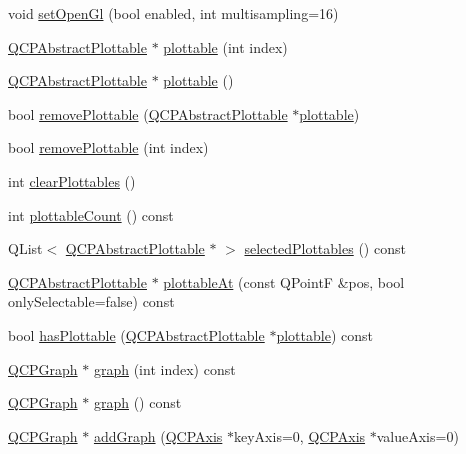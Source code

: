 \begin{DoxyCompactItemize}
\item 
void \hyperlink{class_q_custom_plot_a7db1adc09016329f3aef7c60da935789}{set\+Open\+Gl} (bool enabled, int multisampling=16)
\item 
\hyperlink{class_q_c_p_abstract_plottable}{Q\+C\+P\+Abstract\+Plottable} $\ast$ \hyperlink{class_q_custom_plot_a32de81ff53e263e785b83b52ecd99d6f}{plottable} (int index)
\item 
\hyperlink{class_q_c_p_abstract_plottable}{Q\+C\+P\+Abstract\+Plottable} $\ast$ \hyperlink{class_q_custom_plot_adea38bdc660da9412ba69fb939031567}{plottable} ()
\item 
bool \hyperlink{class_q_custom_plot_af3dafd56884208474f311d6226513ab2}{remove\+Plottable} (\hyperlink{class_q_c_p_abstract_plottable}{Q\+C\+P\+Abstract\+Plottable} $\ast$\hyperlink{class_q_custom_plot_a32de81ff53e263e785b83b52ecd99d6f}{plottable})
\item 
bool \hyperlink{class_q_custom_plot_afc210e0021480f8119bccf37839dbcc8}{remove\+Plottable} (int index)
\item 
int \hyperlink{class_q_custom_plot_a9a409bb3201878adb7ffba1c89c4e004}{clear\+Plottables} ()
\item 
int \hyperlink{class_q_custom_plot_a2dbfbf15dc38713f9a1c445a3dd2e989}{plottable\+Count} () const 
\item 
Q\+List$<$ \hyperlink{class_q_c_p_abstract_plottable}{Q\+C\+P\+Abstract\+Plottable} $\ast$ $>$ \hyperlink{class_q_custom_plot_a6721b8c689bb7f2f400987e580508fe8}{selected\+Plottables} () const 
\item 
\hyperlink{class_q_c_p_abstract_plottable}{Q\+C\+P\+Abstract\+Plottable} $\ast$ \hyperlink{class_q_custom_plot_ac1d1bc6ae4e13616fb02cef6d9e2188e}{plottable\+At} (const Q\+PointF \&pos, bool only\+Selectable=false) const 
\item 
bool \hyperlink{class_q_custom_plot_a4fc28914e2ee91aab424b7ce46b6bdf1}{has\+Plottable} (\hyperlink{class_q_c_p_abstract_plottable}{Q\+C\+P\+Abstract\+Plottable} $\ast$\hyperlink{class_q_custom_plot_a32de81ff53e263e785b83b52ecd99d6f}{plottable}) const 
\item 
\hyperlink{class_q_c_p_graph}{Q\+C\+P\+Graph} $\ast$ \hyperlink{class_q_custom_plot_a6d3ed93c2bf46ab7fa670d66be4cddaf}{graph} (int index) const 
\item 
\hyperlink{class_q_c_p_graph}{Q\+C\+P\+Graph} $\ast$ \hyperlink{class_q_custom_plot_a80c40ced2a74eefe9e92de1e82ba2274}{graph} () const 
\item 
\hyperlink{class_q_c_p_graph}{Q\+C\+P\+Graph} $\ast$ \hyperlink{class_q_custom_plot_a6fb2873d35a8a8089842d81a70a54167}{add\+Graph} (\hyperlink{class_q_c_p_axis}{Q\+C\+P\+Axis} $\ast$key\+Axis=0, \hyperlink{class_q_c_p_axis}{Q\+C\+P\+Axis} $\ast$value\+Axis=0)

\end{DoxyCompactItemize}
